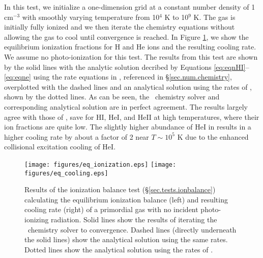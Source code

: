 In this test, we initialize a one-dimension grid at a constant number
density of 1 cm$^{-3}$ with smoothly varying temperature from 10$^{4}$
K to 10$^{9}$ K.  The gas is initially fully ionized and we then
iterate the chemistry equations without allowing the gas to cool until
convergence is reached.  In Figure \ref{fig.eq_test}, we show the
equilibrium ionization fractions for H and He ions and the resulting
cooling rate.  We assume no photo-ionization for this test.  
The results from this test are shown by the solid lines 
with the analytic solution decribed by 
Equations \ref{eq:eqnHI}--\ref{eq:eqne} using the rate equations 
in \enzo, referenced in \S\ref{sec.num.chemistry}, overplotted with
the dashed lines and an analytical solution using the rates 
of \citet{1992ApJS...78..341C}, shown by the dotted lines.  As can be
seen, the \enzo\ chemistry solver and corresponding analytical
solution are in perfect agreement.  The results largely agree with
those of \citet{1992ApJS...78..341C}, save for HI, HeI, and HeII at
high temperatures, where their ion fractions are quite low.  The
slightly higher abundance of HeI in \citet{1992ApJS...78..341C}
results in a higher cooling rate by about a factor of 2 near $T \sim
10^{5}$ K due to the enhanced collisional excitation cooling of HeI.

\begin{figure}
  \begin{center}
    \texttt{[image: figures/eq\_ionization.eps]}
    \texttt{[image: figures/eq\_cooling.eps]}
  \end{center}
  \caption{Results of the ionization balance test
    (\S\ref{sec.tests.ionbalance}) calculating the equilibrium ionization
    balance (left) and resulting cooling rate (right) of a primordial
    gas with no incident photo-ionizing radiation.  Solid lines show
    the results of iterating the \enzo\ chemistry solver to
    convergence.  Dashed lines (directly underneath the solid lines)
    show the analytical solution using the same rates.  Dotted 
    lines show the analytical solution using the rates
    of \citet{1992ApJS...78..341C}.}
  \label{fig.eq_test}
\end{figure}
